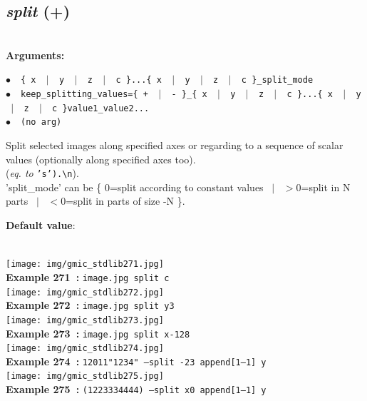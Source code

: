 \documentclass[a4paper,10.5pt,twoside]{book}
\def\comma{\discretionary{,}{}{,}}
\newcommand{\Cb}[1]{\textcolor{cb}{#1}}
\newcommand{\Cc}[1]{\textcolor{cc}{#1}}
\begin{document}
\subsection{\emph{split} (+)}\vspace*{-0.7em}
~\\\textbf{\Cb{Arguments: }}\begin{flushleft}
{\small \Cb{\hspace*{0.5cm}$\bullet$~~\texttt{\{ x ~$|$~ y ~$|$~ z ~$|$~ c \}...\{ x ~$|$~ y ~$|$~ z ~$|$~ c \}{\comma}\_split\_mode}}}~~~\\
{\small \Cb{\hspace*{0.5cm}$\bullet$~~\texttt{keep\_splitting\_values=\{ + ~$|$~ - \}{\comma}\_\{ x ~$|$~ y ~$|$~ z ~$|$~ c \}...\{ x ~$|$~ y\- ~$|$~ z ~$|$~ c \}{\comma}value1{\comma}\_value2{\comma}...}}}~~~\\
{\small \Cb{\hspace*{0.5cm}$\bullet$~~\texttt{(no arg)}}}\end{flushleft}
Split selected images along specified axes{\comma} or regarding to a sequence of scalar values (optionally along specified axes too).
~\\(\emph{eq. to} {\small \texttt{'s').\textbackslash n}}).
~\\'split\_mode' can be \{ 0=split according to constant values ~$|$~ $>$0=split in N parts ~$|$~ $<$0=split in parts of size -N \}.
\begin{flushleft}\Cc{\textbf{Default value}:\\~\\\hspace*{0.5cm}{\small $\bullet$~~\texttt{'split\_mode=-1'.}}}\end{flushleft}
\begin{center}\texttt{[image: img/gmic\_stdlib271.jpg]}\\
{\footnotesize \textbf{Example 271~:} \texttt{image.jpg split c}}
\\\texttt{[image: img/gmic\_stdlib272.jpg]}\\
{\footnotesize \textbf{Example 272~:} \texttt{image.jpg split y{\comma}3}}
\\\texttt{[image: img/gmic\_stdlib273.jpg]}\\
{\footnotesize \textbf{Example 273~:} \texttt{image.jpg split x{\comma}-128}}
\\\texttt{[image: img/gmic\_stdlib274.jpg]}\\
{\footnotesize \textbf{Example 274~:} \texttt{1{\comma}20{\comma}1{\comma}1{\comma}"1{\comma}2{\comma}3{\comma}4" --split -{\comma}2{\comma}3 append[1--1] y}}
\\\texttt{[image: img/gmic\_stdlib275.jpg]}\\
{\footnotesize \textbf{Example 275~:} \texttt{(1{\comma}2{\comma}2{\comma}3{\comma}3{\comma}3{\comma}4{\comma}4{\comma}4{\comma}4) --split x{\comma}0 append[1--1] y}}
\end{center}
\end{document}
